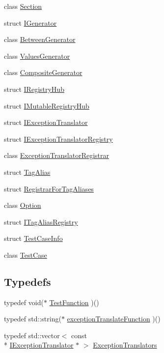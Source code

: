 \begin{DoxyCompactItemize}
class \hyperlink{classCatch_1_1Section}{Section}
\item 
struct \hyperlink{structCatch_1_1IGenerator}{I\-Generator}
\item 
class \hyperlink{classCatch_1_1BetweenGenerator}{Between\-Generator}
\item 
class \hyperlink{classCatch_1_1ValuesGenerator}{Values\-Generator}
\item 
class \hyperlink{classCatch_1_1CompositeGenerator}{Composite\-Generator}
\item 
struct \hyperlink{structCatch_1_1IRegistryHub}{I\-Registry\-Hub}
\item 
struct \hyperlink{structCatch_1_1IMutableRegistryHub}{I\-Mutable\-Registry\-Hub}
\item 
struct \hyperlink{structCatch_1_1IExceptionTranslator}{I\-Exception\-Translator}
\item 
struct \hyperlink{structCatch_1_1IExceptionTranslatorRegistry}{I\-Exception\-Translator\-Registry}
\item 
class \hyperlink{classCatch_1_1ExceptionTranslatorRegistrar}{Exception\-Translator\-Registrar}
\item 
struct \hyperlink{structCatch_1_1TagAlias}{Tag\-Alias}
\item 
struct \hyperlink{structCatch_1_1RegistrarForTagAliases}{Registrar\-For\-Tag\-Aliases}
\item 
class \hyperlink{classCatch_1_1Option}{Option}
\item 
struct \hyperlink{structCatch_1_1ITagAliasRegistry}{I\-Tag\-Alias\-Registry}
\item 
struct \hyperlink{structCatch_1_1TestCaseInfo}{Test\-Case\-Info}
\item 
class \hyperlink{classCatch_1_1TestCase}{Test\-Case}
\end{DoxyCompactItemize}
\subsection*{Typedefs}
\begin{DoxyCompactItemize}
\item 
typedef void($\ast$ \hyperlink{namespaceCatch_a768da872b9033e4c71c6f316393d35db}{Test\-Function} )()
\item 
typedef std\-::string($\ast$ \hyperlink{namespaceCatch_ae1727c8cadfc5ad8b43dff651cd2f8b0}{exception\-Translate\-Function} )()
\item 
typedef std\-::vector$<$ const \\*
\hyperlink{structCatch_1_1IExceptionTranslator}{I\-Exception\-Translator} $\ast$ $>$ \hyperlink{namespaceCatch_ae0442a3627f91437716106138b5f540b}{Exception\-Translators}
\end{DoxyCompactItemize}

